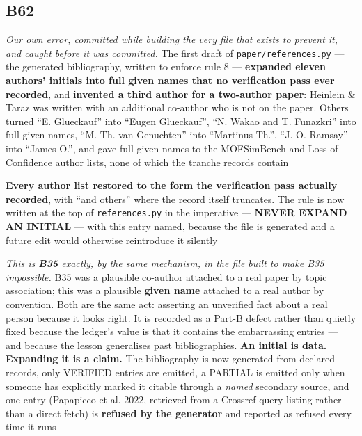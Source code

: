 \documentclass[10pt]{article}
\begin{document}
\subsection*{B62}\label{led:B62}
\begin{description}[leftmargin=0pt,itemsep=1pt]
\item[Defect.] \emph{Our own error, committed while building the very file that exists to prevent it, and caught before it was committed.} The first draft of \texttt{paper/references.py} --- the generated bibliography, written to enforce rule 8 --- \textbf{expanded eleven authors' initials into full given names that no verification pass ever recorded}, and \textbf{invented a third author for a two-author paper}: Heinlein \& Taraz was written with an additional co-author who is not on the paper. Others turned ``E. Glueckauf'' into ``Eugen Glueckauf'', ``N. Wakao and T. Funazkri'' into full given names, ``M. Th. van Genuchten'' into ``Martinus Th.'', ``J. O. Ramsay'' into ``James O.'', and gave full given names to the MOFSimBench and Loss-of-Confidence author lists, none of which the tranche records contain
\item[Resolution.] \textbf{Every author list restored to the form the verification pass actually recorded}, with ``and others'' where the record itself truncates. The rule is now written at the top of \texttt{references.py} in the imperative --- \textbf{NEVER EXPAND AN INITIAL} --- with this entry named, because the file is generated and a future edit would otherwise reintroduce it silently
\item[Note.] \emph{This is \textbf{B35} exactly, by the same mechanism, in the file built to make B35 impossible.} B35 was a plausible co-author attached to a real paper by topic association; this was a plausible \textbf{given name} attached to a real author by convention. Both are the same act: asserting an unverified fact about a real person because it looks right. It is recorded as a Part-B defect rather than quietly fixed because the ledger's value is that it contains the embarrassing entries --- and because the lesson generalises past bibliographies. \textbf{An initial is data. Expanding it is a claim.} The bibliography is now generated from declared records, only VERIFIED entries are emitted, a PARTIAL is emitted only when someone has explicitly marked it citable through a \emph{named} secondary source, and one entry (Papapicco et al. 2022, retrieved from a Crossref query listing rather than a direct fetch) is \textbf{refused by the generator} and reported as refused every time it runs
\end{description}
\end{document}
